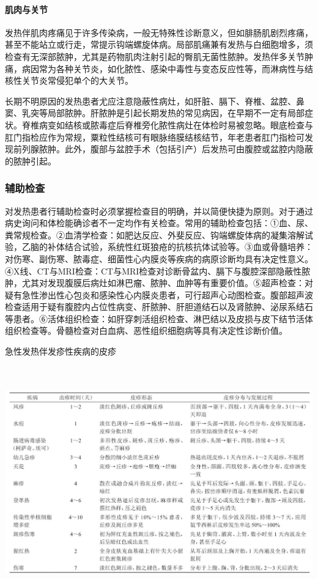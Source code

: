 \paragraph{肌肉与关节}

发热伴肌肉疼痛见于许多传染病，一般无特殊性诊断意义，但如腓肠肌剧烈疼痛，甚至不能站立或行走，常提示钩端螺旋体病。局部肌痛兼有发热与白细胞增多，须检查有无深部脓肿，尤其是药物肌肉注射引起的臀肌无菌性脓肿。发热伴多关节肿痛，病因常为各种关节炎，如化脓性、感染中毒性与变态反应性等，而淋病性与结核性关节炎常侵犯单个的大关节。

长期不明原因的发热患者尤应注意隐蔽性病灶，如肝脏、膈下、脊椎、盆腔、鼻窦、乳突等局部脓肿。肝脓肿是引起长期发热的常见病因，在早期不一定有局部症状。脊椎病变如结核或脓毒症后脊椎旁化脓性病灶在体检时易被忽略。眼底检查与肛门指检应作为常规，粟粒性结核可有眼脉络膜结核结节，年老患者肛门指检可发现前列腺脓肿。此外，腹部与盆腔手术（包括引产）后发热可由腹腔或盆腔内隐蔽的脓肿引起。

\subsubsection{辅助检查}

对发热患者行辅助检查时必须掌握检查目的明确，并以简便快捷为原则。对于通过病史询问和体检能确诊者不一定均作有关检查。常用的辅助检查包括：①血、尿、粪常规检查。②血清学检查：如肥达反应、外斐反应、钩端螺旋体病的凝集溶解试验，乙脑的补体结合试验，系统性红斑狼疮的抗核抗体试验等。③血或骨髓培养：对伤寒、副伤寒、脓毒症、细菌性心内膜炎等疾病的病原诊断均具有决定性意义。④X线、CT与MRI检查：CT与MRI检查对诊断骨盆内、膈下与腹腔深部隐蔽性脓肿，尤其对发现腹膜后病灶如淋巴瘤、脓肿、血肿等有重要价值。⑤超声检查：对疑有急性渗出性心包炎和感染性心内膜炎患者，可行超声心动图检查。腹部超声波检查适用于疑有腹腔内占位性病变、肝脓肿、肝胆道结石以及肾脓肿、泌尿系结石等患者。⑥活体组织检查：如肝穿刺活组织检查、淋巴结以及皮损与皮下结节活体组织检查等。骨髓检查对白血病、恶性组织细胞病等具有决定性诊断价值。

\begin{table}[htbp]
\centering
\caption{急性发热伴发疹性疾病的皮疹}
\label{tab1-1}
\includegraphics[width=6.625in,height=3.95833in]{./images/Image00003.jpg}
\end{table}

